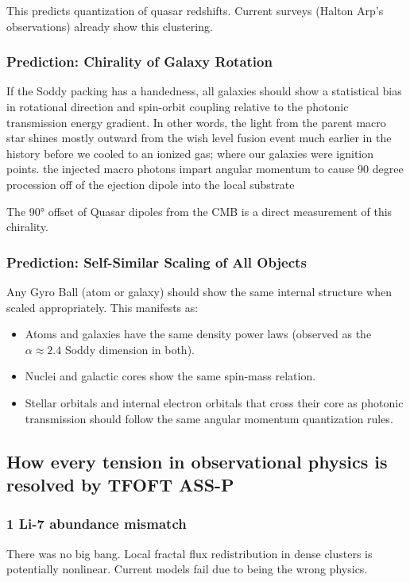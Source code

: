 \documentclass[11pt,a4paper]{article}
\begin{document}
      This predicts quantization of quasar redshifts. Current surveys (Halton Arp's observations) already show this clustering.

    \subsubsection{Prediction: Chirality of Galaxy Rotation}

    If the Soddy packing has a handedness, all galaxies should show a statistical bias in rotational direction and spin-orbit coupling relative to the photonic transmission energy gradient. In other words, the light from the parent macro star shines mostly outward from the wish level fusion event much earlier in the history before we cooled to an ionized gas; where our galaxies were ignition points. the injected macro photons impart angular momentum to cause 90 degree procession off of the ejection dipole into the local substrate 

    The 90° offset of Quasar dipoles from the CMB is a direct measurement of this chirality.

    \subsubsection{Prediction: Self-Similar Scaling of All Objects}

    Any Gyro Ball (atom or galaxy) should show the same internal structure when scaled appropriately. This manifests as:

    \begin{itemize}
    \item Atoms and galaxies have the same density power laws (observed as the $\alpha \approx 2.4$ Soddy dimension in both).
    \item Nuclei and galactic cores show the same spin-mass relation.
    \item Stellar orbitals and internal electron orbitals that cross their core as photonic transmission should follow the same angular momentum quantization rules.
    \end{itemize}

  \subsection{
  How every tension in observational physics is resolved by TFOFT ASS-P 
  }

    \subsubsection{
    1 Li-7 abundance mismatch 
    }
      There was no big bang. Local fractal flux redistribution in dense clusters is potentially nonlinear. Current models fail due to being the wrong physics.
\end{document}
